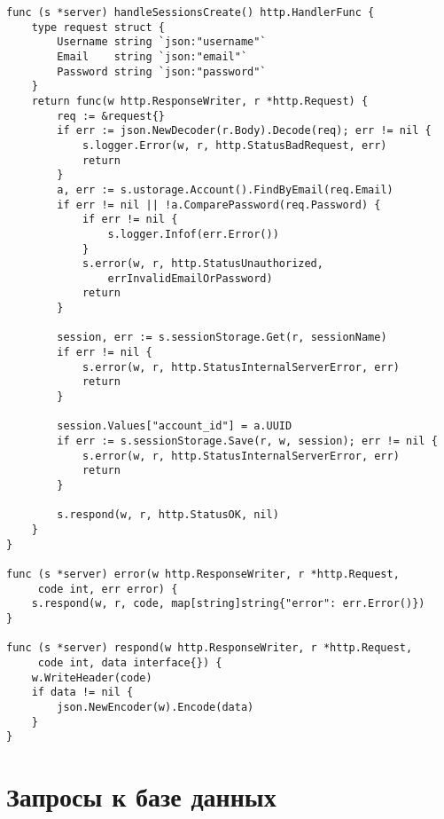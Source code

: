 \begin{lstlisting}[label=lst:sessions,caption=Маршрутизация запроса аутентификации]
func (s *server) handleSessionsCreate() http.HandlerFunc {
	type request struct {
		Username string `json:"username"`
		Email    string `json:"email"`
		Password string `json:"password"`
	}
	return func(w http.ResponseWriter, r *http.Request) {
		req := &request{}
		if err := json.NewDecoder(r.Body).Decode(req); err != nil {
			s.logger.Error(w, r, http.StatusBadRequest, err)
			return
		}
		a, err := s.ustorage.Account().FindByEmail(req.Email)
		if err != nil || !a.ComparePassword(req.Password) {
			if err != nil {
				s.logger.Infof(err.Error())
			}
			s.error(w, r, http.StatusUnauthorized, 
				errInvalidEmailOrPassword)
			return
		}
		
		session, err := s.sessionStorage.Get(r, sessionName)
		if err != nil {
			s.error(w, r, http.StatusInternalServerError, err)
			return
		}
		
		session.Values["account_id"] = a.UUID
		if err := s.sessionStorage.Save(r, w, session); err != nil {
			s.error(w, r, http.StatusInternalServerError, err)
			return
		}
		
		s.respond(w, r, http.StatusOK, nil)
	}
}

func (s *server) error(w http.ResponseWriter, r *http.Request,
	 code int, err error) {
	s.respond(w, r, code, map[string]string{"error": err.Error()})
}

func (s *server) respond(w http.ResponseWriter, r *http.Request,
	 code int, data interface{}) {
	w.WriteHeader(code)
	if data != nil {
		json.NewEncoder(w).Encode(data)
	}
}
\end{lstlisting}

\section{Запросы к базе данных}